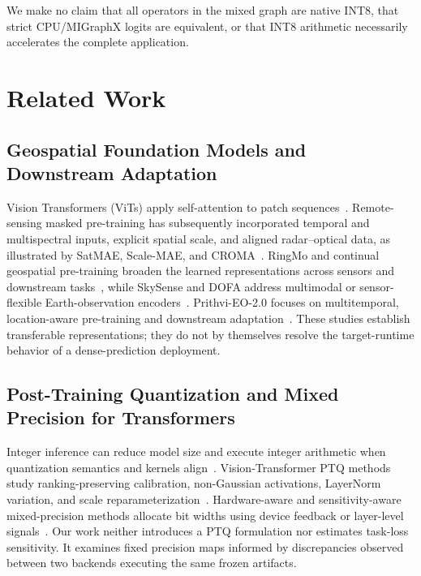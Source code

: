 \documentclass[conference]{IEEEtran}
\begin{document}
We make no claim that all operators in the mixed graph are native INT8, that strict CPU/MIGraphX logits are equivalent, or that INT8 arithmetic necessarily accelerates the complete application.

\section{Related Work}
\label{sec:related_work}

\subsection{Geospatial Foundation Models and Downstream Adaptation}

Vision Transformers (ViTs) apply self-attention to patch sequences~\cite{vit2021}. Remote-sensing masked pre-training has subsequently incorporated temporal and multispectral inputs, explicit spatial scale, and aligned radar--optical data, as illustrated by SatMAE, Scale-MAE, and CROMA~\cite{satmae2022,scalemae2023,croma2023}. RingMo and continual geospatial pre-training broaden the learned representations across sensors and downstream tasks~\cite{ringmo2023,gfm2023}, while SkySense and DOFA address multimodal or sensor-flexible Earth-observation encoders~\cite{skysense2024,dofa2024}. Prithvi-EO-2.0 focuses on multitemporal, location-aware pre-training and downstream adaptation~\cite{prithvi2024}. These studies establish transferable representations; they do not by themselves resolve the target-runtime behavior of a dense-prediction deployment.

\subsection{Post-Training Quantization and Mixed Precision for Transformers}

Integer inference can reduce model size and execute integer arithmetic when quantization semantics and kernels align~\cite{jacob2018}. Vision-Transformer PTQ methods study ranking-preserving calibration, non-Gaussian activations, LayerNorm variation, and scale reparameterization~\cite{vitptq2021,ptq4vit2022,fqvit2022,repqvit2023}. Hardware-aware and sensitivity-aware mixed-precision methods allocate bit widths using device feedback or layer-level signals~\cite{haq2019,hawqv3,mixqvit2026}. Our work neither introduces a PTQ formulation nor estimates task-loss sensitivity. It examines fixed precision maps informed by discrepancies observed between two backends executing the same frozen artifacts.
\end{document}
